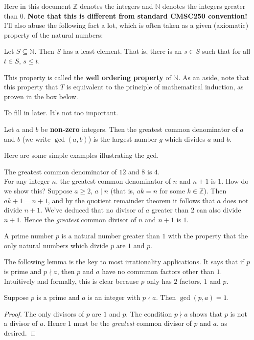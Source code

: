 Here in this document $\mathbb{Z}$ denotes the integers and $\mathbb{N}$ denotes the integers greater than $0$. \textbf{Note that this is different from standard CMSC250 convention!} I'll also abuse the following fact a lot, which is often taken as a given (axiomatic) property of the natural numbers:

\begin{tcolorbox}
 Let $S \subseteq \mathbb{N}$. Then $S$ has a least element. That is, there is an $s \in S$ such that for all $t \in S$, $s \leq t$.
\end{tcolorbox}

This property is called the \textbf{well ordering property} of $\mathbb{N}$. As an aside, note that this property that $T$ is equivalent to the principle of mathematical induction, as proven in the box below.
\begin{tcolorbox}
 To fill in later. It's not too important.
\end{tcolorbox}

\begin{definition}
 Let $a$ and $b$ be \textbf{non-zero} integers. Then the greatest common denominator of $a$ and $b$ (we write $\gcd(a, b)$) is the largest number $g$ which divides $a$ and $b$.
\end{definition}

\begin{example} Here are some simple examples illustrating the gcd.
    \begin{tcolorbox}
      The greatest common denominator of $12$ and $8$ is $4$. \\ For any integer $n$, the greatest common denominator of $n$ and $n + 1$ is $1$. How do we show this? Suppose $a \geq 2$, $a \mid n$ (that is, $ak = n$ for some $k \in \mathbb{Z}$). Then $ak + 1 = n + 1$, and by the quotient remainder theorem it follows that $a$ does not divide $n + 1$. We've deduced that no divisor of $a$ greater than $2$ can also divide $n + 1$. Hence the \textit{greatest} common divisor of $n$ and $n + 1$ is $1$.
    \end{tcolorbox}
\end{example}

\begin{definition}
 A prime number $p$ is a natural number greater than $1$ with the property that the only natural numbers which divide $p$ are $1$ and $p$.
\end{definition}

The following lemma is the key to most irrationality applications. It says that if $p$ is prime and $p \nmid a$, then $p$ and $a$ have no commmon factors other than $1$. Intuitively and formally, this is clear because $p$ only has $2$ factors, $1$ and $p$.
\begin{lemma}
    Suppose $p$ is a prime and $a$ is an integer with $p \nmid a$. Then $\gcd(p, a) = 1$.
\end{lemma}
\begin{proof}
The only divisors of $p$ are $1$ and $p$. The condition $p \nmid a$ shows that $p$ is not a divisor of $a$. Hence $1$ must be the \textit{greatest} common divisor of $p$ and $a$, as desired.
\end{proof}

